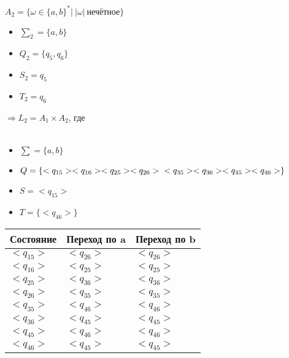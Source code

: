 \documentclass{article}
\begin{document}
\begin{enumerate}
            $A_2 = \{ \omega \in \{a,b\}^*| \ |\omega|\ \text{нечётное} \}$ \\

            \begin{center}
            \end{center}
            
            \begin{itemize}
                \item $\sum_2 = \{ a,b \}$ \\
                \item $Q_2 = \{ q_5, q_6\} $ \\
                \item $S_2 = q_5$ \\
                \item $T_2 = q_6$ \\
            \end{itemize}

            $\Rightarrow L_2 = A_1 \times A_2$, где \\ \\
            \begin{itemize}
                \item $\sum = \{ a,b \}$ \\
                \item $Q = \{<q_{15}> <q_{16}> <q_{25}> <q_{26}> \\ <q_{35}> <q_{36}> <q_{45}> <q_{46}> \}$ \\
                \item $S = <q_{15}>$ \\
                \item $T = \{<q_{46}> \}$ \\
            \end{itemize}

            \begin{tabular}{ | l | l | l | }
                \hline
                Состояние & Переход по a & Переход по b \\ \hline
                $<q_{15}>$ & $<q_{26}>$ & $<q_{26}>$  \\ \hline
                $<q_{16}>$ & $<q_{25}>$ & $<q_{25}>$ \\ \hline
                $<q_{25}>$ & $<q_{36}>$ & $<q_{36}>$ \\ \hline
                $<q_{26}>$ & $<q_{35}>$ & $<q_{35}>$ \\ \hline
                $<q_{35}>$ & $<q_{46}>$ & $<q_{46}>$ \\ \hline
                $<q_{36}>$ & $<q_{45}>$ & $<q_{45}>$ \\ \hline 
                $<q_{45}>$ & $<q_{46}>$ & $<q_{46}>$ \\ \hline
                $<q_{46}>$ & $<q_{45}>$ & $<q_{45}>$ \\
                \hline
            \end{tabular} \\


\end{enumerate}
\end{document}
